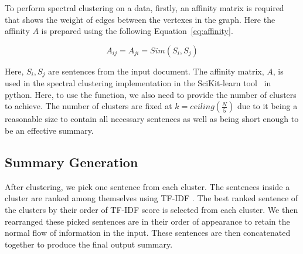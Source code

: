 To perform spectral clustering on a data, firstly, an affinity matrix is required that shows
the weight of edges between the vertexes in the graph.
Here the affinity $A$ is prepared using the following Equation~\ref{eq:affinity}.

\begin{equation}\label{eq:affinity}
    A_{ij}=A_{ji}=Sim(S_i,S_j)
\end{equation}

Here, $S_i, S_j$ are sentences from the input document.
The affinity matrix, $A$, is used in the spectral clustering implementation in the SciKit-learn
tool~\cite{Pedregosa-2011-scikit-learn} in python.
Here, to use the function, we also need to provide the number of clusters to achieve.
The number of clusters are fixed at $k=ceiling\left(\frac{N}{5}\right)$ due to it being a
reasonable size to contain all necessary sentences as well as being short enough to be an effective summary.

\subsection{Summary Generation}\label{subsec:summary-generation}
After clustering, we pick one sentence from each cluster.
The sentences inside a cluster are ranked among themselves using TF-IDF .
The best ranked sentence of the clusters by their order of TF-IDF score is
selected from each cluster.
We then rearranged these picked sentences are in their order of appearance to retain the normal flow of
information in the input.
These sentences are then concatenated together to produce the final output summary.